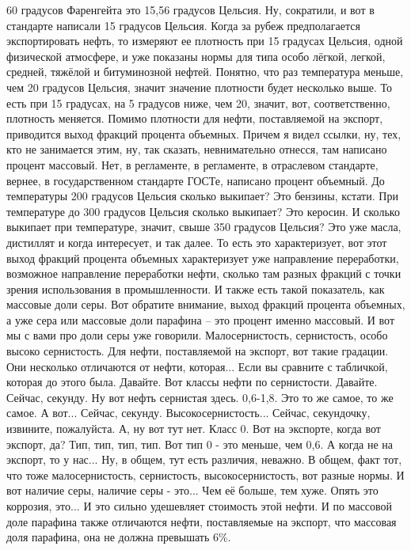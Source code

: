 \documentclass[main.tex]{subfiles}
\begin{document}
60 градусов Фаренгейта это 15,56 градусов Цельсия.
Ну, сократили, и вот в стандарте написали 15 градусов Цельсия.
Когда за рубеж предполагается экспортировать нефть, то измеряют ее плотность при 15 градусах Цельсия, одной физической атмосфере, и уже показаны нормы для типа особо лёгкой, легкой, средней, тяжёлой и битуминозной нефтей.
Понятно, что раз температура меньше, чем 20 градусов Цельсия, значит значение плотности будет несколько выше.
То есть при 15 градусах, на 5 градусов ниже, чем 20, значит, вот, соответственно, плотность меняется.
Помимо плотности для нефти, поставляемой на экспорт, приводится выход фракций процента объемных.
Причем я видел ссылки, ну, тех, кто не занимается этим, ну, так сказать, невнимательно отнесся, там написано процент массовый.
Нет, в регламенте, в регламенте, в отраслевом стандарте, вернее, в государственном стандарте ГОСТе, написано процент объемный.
До температуры 200 градусов Цельсия сколько выкипает?
Это бензины, кстати.
При температуре до 300 градусов Цельсия сколько выкипает?
Это керосин.
И сколько выкипает при температуре, значит, свыше 350 градусов Цельсия?
Это уже масла, дистиллят и когда интересует, и так далее.
То есть это характеризует, вот этот выход фракций процента объемных характеризует уже направление переработки, возможное направление переработки нефти, сколько там разных фракций с точки зрения использования в промышленности.
И также есть такой показатель, как массовые доли серы.
Вот обратите внимание, выход фракций процента объемных, а уже сера или массовые доли парафина -- это процент именно массовый.
И вот мы с вами про доли серы уже говорили.
Малосернистость, сернистость, особо высоко сернистость.
Для нефти, поставляемой на экспорт, вот такие градации.
Они несколько отличаются от нефти, которая...
Если вы сравните с табличкой, которая до этого была.
Давайте.
Вот классы нефти по сернистости.
Давайте.
Сейчас, секунду.
Ну вот нефть сернистая здесь.
0,6-1,8.
Это то же самое, то же самое.
А вот...
Сейчас, секунду.
Высокосернистость...
Сейчас, секундочку, извините, пожалуйста.
А, ну вот тут нет.
Класс 0.
Вот на экспорте, когда вот экспорт, да?
Тип, тип, тип, тип.
Вот тип 0 - это меньше, чем 0,6.
А когда не на экспорт, то у нас...
Ну, в общем, тут есть различия, неважно.
В общем, факт тот, что тоже малосернистость, сернистость, высокосернистость, вот разные нормы.
И вот наличие серы, наличие серы - это...
Чем её больше, тем хуже.
Опять это коррозия, это...
И это сильно удешевляет стоимость этой нефти.
И по массовой доле парафина также отличаются нефти, поставляемые на экспорт, что массовая доля парафина, она не должна превышать 6\%.
\end{document}

